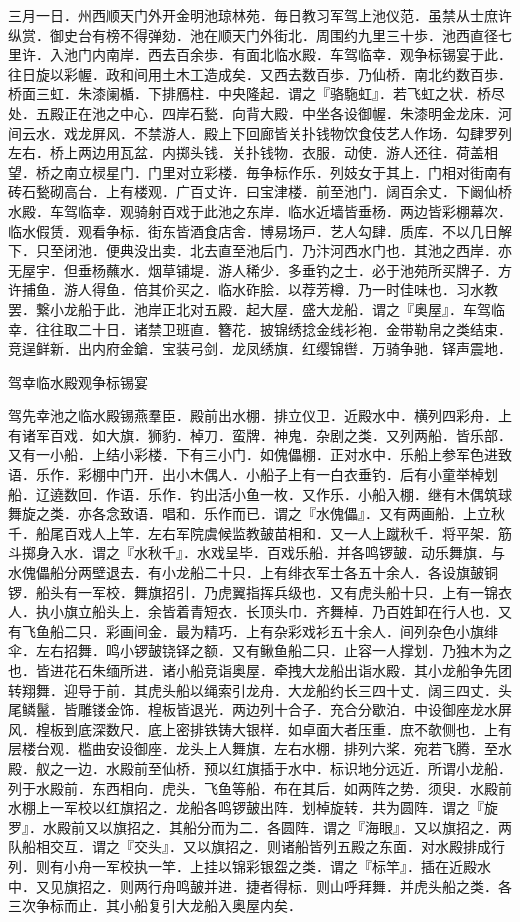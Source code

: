 \documentclass[]{article}
\begin{document}
三月一日．州西顺天门外开金明池琼林苑．毎日教习军驾上池仪范．虽禁从士庶许纵赏．御史台有榜不得弹劾．池在顺天门外街北．周围约九里三十歩．池西直径七里许．入池门内南岸．西去百余歩．有面北临水殿．车驾临幸．观争标锡宴于此．往日旋以彩幄．政和间用土木工造成矣．又西去数百歩．乃仙桥．南北约数百歩．桥面三虹．朱漆阑楯．下排鴈柱．中央隆起．谓之『骆駞虹』．若飞虹之状．桥尽处．五殿正在池之中心．四岸石甃．向背大殿．中坐各设御幄．朱漆明金龙床．河间云水．戏龙屏风．不禁游人．殿上下回廊皆关扑钱物饮食伎艺人作场．勾肆罗列左右．桥上两边用瓦盆．内掷头钱．关扑钱物．衣服．动使．游人还往．荷盖相望．桥之南立棂星门．门里对立彩楼．毎争标作乐．列妓女于其上．门相对街南有砖石甃砌高台．上有楼观．广百丈许．曰宝津楼．前至池门．阔百余丈．下阚仙桥水殿．车驾临幸．观骑射百戏于此池之东岸．临水近墙皆垂杨．两边皆彩棚幕次．临水假赁．观看争标．街东皆酒食店舎．博易场戸．艺人勾肆．质库．不以几日解下．只至闭池．便典没出卖．北去直至池后门．乃汴河西水门也．其池之西岸．亦无屋宇．但垂杨蘸水．烟草铺堤．游人稀少．多垂钓之士．必于池苑所买牌子．方许捕鱼．游人得鱼．倍其价买之．临水砟脍．以荐芳樽．乃一时佳味也．习水教罢．繋小龙船于此．池岸正北对五殿．起大屋．盛大龙船．谓之『奥屋』．车驾临幸．往往取二十日．诸禁卫班直．簪花．披锦绣捻金线衫袍．金带勒帛之类结束．竞逞鲜新．出内府金鎗．宝装弓剑．龙凤绣旗．红缨锦辔．万骑争驰．铎声震地．

驾幸临水殿观争标锡宴

驾先幸池之临水殿锡燕羣臣．殿前出水棚．排立仪卫．近殿水中．横列四彩舟．上有诸军百戏．如大旗．狮豹．棹刀．蛮牌．神鬼．杂剧之类．又列两船．皆乐部．又有一小船．上结小彩楼．下有三小门．如傀儡棚．正对水中．乐船上参军色进致语．乐作．彩棚中门开．出小木偶人．小船子上有一白衣垂钓．后有小童举棹划船．辽遶数回．作语．乐作．钓出活小鱼一枚．又作乐．小船入棚．继有木偶筑球舞旋之类．亦各念致语．唱和．乐作而已．谓之『水傀儡』．又有两画船．上立秋千．船尾百戏人上竿．左右军院虞候监教皷苗相和．又一人上蹴秋千．将平架．筋斗掷身入水．谓之『水秋千』．水戏呈毕．百戏乐船．并各鸣锣皷．动乐舞旗．与水傀儡船分两壁退去．有小龙船二十只．上有绯衣军士各五十余人．各设旗皷铜锣．船头有一军校．舞旗招引．乃虎翼指挥兵级也．又有虎头船十只．上有一锦衣人．执小旗立船头上．余皆着青短衣．长顶头巾．齐舞棹．乃百姓卸在行人也．又有飞鱼船二只．彩画间金．最为精巧．上有杂彩戏衫五十余人．间列杂色小旗绯伞．左右招舞．鸣小锣皷铙铎之额．又有鳅鱼船二只．止容一人撑划．乃独木为之也．皆进花石朱缅所进．诸小船竞诣奥屋．牵拽大龙船出诣水殿．其小龙船争先团转翔舞．迎导于前．其虎头船以绳索引龙舟．大龙船约长三四十丈．阔三四丈．头尾鳞鬣．皆雕镂金饰．楻板皆退光．两边列十合子．充合分歇泊．中设御座龙水屏风．楻板到底深数尺．底上密排铁铸大银样．如卓面大者压重．庶不欹侧也．上有层楼台观．槛曲安设御座．龙头上人舞旗．左右水棚．排列六桨．宛若飞腾．至水殿．舣之一边．水殿前至仙桥．预以红旗插于水中．标识地分远近．所谓小龙船．列于水殿前．东西相向．虎头．飞鱼等船．布在其后．如两阵之势．须臾．水殿前水棚上一军校以红旗招之．龙船各鸣锣皷出阵．划棹旋转．共为圆阵．谓之『旋罗』．水殿前又以旗招之．其船分而为二．各圆阵．谓之『海眼』．又以旗招之．两队船相交互．谓之『交头』．又以旗招之．则诸船皆列五殿之东面．对水殿排成行列．则有小舟一军校执一竿．上挂以锦彩银盌之类．谓之『标竿』．插在近殿水中．又见旗招之．则两行舟鸣皷并进．捷者得标．则山呼拜舞．并虎头船之类．各三次争标而止．其小船复引大龙船入奥屋内矣．
\end{document}
